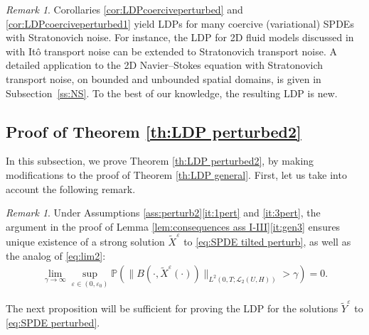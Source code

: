 \documentclass{amsart}
\newcommand{\UH}{\mathscr{L}_2(U,H)}
\newcommand{\<}{\langle}
\newcommand{\?}{\rangle}
\theoremstyle{plain}
\theoremstyle{remark}
\newtheorem{remark}[theorem]{Remark}
\theoremstyle{plain}
\numberwithin{equation}{section}
\renewcommand{\P}{\mathbb{P}}
\newcommand{\eps}{\varepsilon}
\begin{document}
\begin{remark}\label{ex:stratonovich coercive}
Corollaries \ref{cor:LDPcoerciveperturbed} and \ref{cor:LDPcoerciveperturbed1} yield LDPs for many coercive (variational) SPDEs with Stratonovich noise. 
For instance, the LDP for 2D fluid models discussed in \cite[\S5.1]{TV24} with It\^o transport noise can be extended to Stratonovich transport noise. 
A detailed application to the 2D Navier--Stokes equation with Stratonovich transport noise, on bounded and unbounded spatial domains,  is given in Subsection~\ref{ss:NS}. To the best of our knowledge, the resulting LDP is new. 
\end{remark}

\subsection{Proof of Theorem \ref{th:LDP perturbed2}}\label{ss:proof perturb}


In this subsection, we prove Theorem \ref{th:LDP perturbed2}, by making modifications to the proof of Theorem \ref{th:LDP general}. 
First, let us take into account the following remark. 
\begin{remark}\label{rem: tilde YW}
Under Assumptions \ref{ass:perturb2}\ref{it:1pert} and \ref{it:3pert}, the argument in the proof of Lemma \ref{lem:consequences ass I-III}\ref{it:gen3} ensures  unique existence of a strong solution  $\tilde{X}^\eps$ to \eqref{eq:SPDE tilted perturb}, as well as the analog of \eqref{eq:lim2}:
\begin{align} 
\lim_{\gamma\to\infty} \sup_{\eps\in(0,\eps_0)}\P(\|B(\cdot,\tilde{X}^\eps(\cdot))\|_{L^2(0,T;\UH)}>\gamma)=0.\label{eq:lim2 tilde}
\end{align}   
\end{remark}   

The next proposition will be sufficient for proving the LDP for the solutions $\tilde{Y}^\eps$ to \eqref{eq:SPDE perturbed}. 
\end{document}
